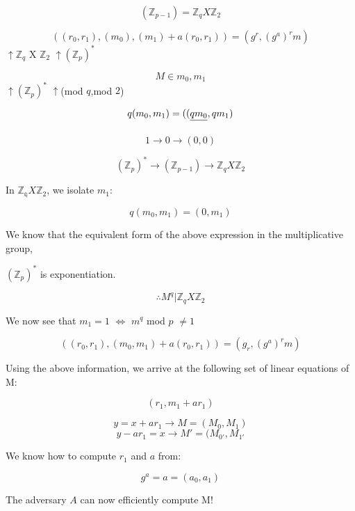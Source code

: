 \documentclass[12pt, a4paper]{article}
\begin{document}
\pagestyle{fancy}

\vspace{0.5cm}
\vspace{0.25cm}

\hspace{6.0cm}{\normalsize September 5, 2013}

\vspace{0.25cm}
\hspace{6.2cm}{\normalsize David Leonard}

\vspace{0.25cm}

\vspace{0.7cm}



$$(\mathbb{Z}_{p-1}) = \mathbb{Z}_{q} X \mathbb{Z}_{2}$$

$$((r_0, r_1), (m_0), (m_1) + a(r_0, r_1)) = (g^r, (g^a)^rm)$$
             \hspace{5.0cm}$\uparrow$$\mathbb{Z}_{q}$ X $\mathbb{Z}_{2}$ \hspace{3.5cm}   $\uparrow$$(\mathbb{Z}_{p})^*$\newline
             
             
$$ M \in {m_0, m_1}$$
  \hspace{6.5cm} $\uparrow$$(\mathbb{Z}_{p})^*$	$\uparrow$(mod $q$,mod $2$)

$$q(m_0, m_1) = ((\sout{qm_0}, qm_1)$$


$$ 1 \longrightarrow 0 \longrightarrow (0,0) $$


$$ (\mathbb{Z}_{p})^* \longrightarrow (\mathbb{Z}_{p-1}) \longrightarrow \mathbb{Z}_{q} X \mathbb{Z}_{2} $$

In $\mathbb{Z_{q}} X \mathbb{Z}_{2}$, we isolate $m_1$:

$$q(m_0, m_1) = (0, m_1)$$

We know that the equivalent form of the above expression in the multiplicative group,  \newline

$(\mathbb{Z}_{p})^*$ is exponentiation.

$$\therefore  M^q | \mathbb{Z}_{q} X \mathbb{Z}_{2}$$

We now see that $m_1 = 1$ $\Leftrightarrow$ $m^q$ mod $p$ $\ne 1$

$$((r_0, r_1), (m_0, m_1) + a(r_0, r_1)) = (g_r, (g^a)^rm)$$

Using the above information, we arrive at the following set of linear equations of M:

$$(r_1, m_1 + ar_1)$$

$$y = x + ar_1 \longrightarrow M = (M_0, M_1)$$
$$y - ar_1 = x \longrightarrow M' = (M_{0'}, M_{1'}$$

We know how to compute $r_1$ and $a$ from: 

$$g^a = a = (a_0, a_1)$$

The adversary $A$ can now efficiently compute M! 
\end{document}
